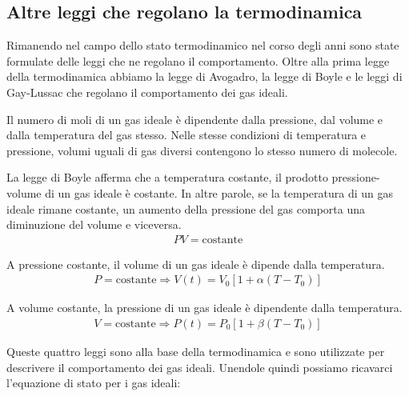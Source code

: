     \subsection{Altre leggi che regolano la termodinamica}
        Rimanendo nel campo dello stato termodinamico nel corso degli anni sono state formulate delle leggi che ne regolano il comportamento. Oltre alla prima legge della termodinamica abbiamo la legge di Avogadro, la legge di Boyle e le leggi di Gay-Lussac che regolano il comportamento dei gas ideali.
        \begin{definition}
            Il numero di moli di un gas ideale è dipendente dalla pressione, dal volume e dalla temperatura del gas stesso.\newline
            Nelle stesse condizioni di temperatura e pressione, volumi uguali di gas diversi contengono lo stesso numero di molecole.
        \end{definition}
        \begin{definition}
            La legge di Boyle afferma che a temperatura costante, il prodotto pressione-volume di un gas ideale è costante. In altre parole, se la temperatura di un gas ideale rimane costante, un aumento della pressione del gas comporta una diminuzione del volume e viceversa.
            \begin{align}
                PV = \text{costante} \label{eq:legge_boyle}
            \end{align}
        \end{definition}
        \begin{definition}
            A pressione costante, il volume di un gas ideale è dipende dalla temperatura.
            \begin{align}
                P = \text{costante} \Rightarrow V(t)=V_0\left[1+\alpha(T-T_0)\right]
            \end{align}
        \end{definition}
        \begin{definition}
            A volume costante, la pressione di un gas ideale è dipendente dalla temperatura.
            \begin{align}
                V = \text{costante} \Rightarrow P(t)=P_0\left[1+\beta(T-T_0)\right]
            \end{align}
        \end{definition}
        Queste quattro leggi sono alla base della termodinamica e sono utilizzate per descrivere il comportamento dei gas ideali. Unendole quindi possiamo ricavarci l'equazione di stato per i gas ideali:
